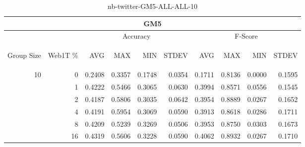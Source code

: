 \begin{center}
\begin{table}[htbp]
\begin{tabular}{ | r | r | r | r | r | r | r | r | r | r |}
\hline
\multicolumn{10}{|c|}{GM5}\\
\hline
 & & \multicolumn{4}{|c|}{Accuracy} & \multicolumn{4}{|c|}{F-Score}\\ \cline{3-10}
\begin{sideways}Group Size\end{sideways} & \begin{sideways}Web1T \%\end{sideways} & \begin{sideways}AVG\end{sideways} & \begin{sideways}MAX\end{sideways} & \begin{sideways}MIN\end{sideways} & \begin{sideways}STDEV\end{sideways} & \begin{sideways}AVG\end{sideways} & \begin{sideways}MAX\end{sideways} & \begin{sideways}MIN\end{sideways} & \begin{sideways}STDEV\end{sideways}\\
\hline
\multirow{5}{*}{10}
 & 0 & 0.2408 & 0.3357 & 0.1748 & 0.0354 & 0.1711 & 0.8136 & 0.0000 & 0.1595\\ \cline{2-10}
 & 1 & 0.4222 & 0.5466 & 0.3065 & 0.0630 & 0.3994 & 0.8571 & 0.0556 & 0.1545\\ \cline{2-10}
 & 2 & 0.4187 & 0.5806 & 0.3035 & 0.0642 & 0.3954 & 0.8889 & 0.0267 & 0.1652\\ \cline{2-10}
 & 4 & 0.4191 & 0.5954 & 0.3069 & 0.0590 & 0.3913 & 0.8618 & 0.0286 & 0.1711\\ \cline{2-10}
 & 8 & 0.4209 & 0.5239 & 0.3269 & 0.0506 & 0.3953 & 0.8750 & 0.0303 & 0.1673\\ \cline{2-10}
 & 16 & 0.4319 & 0.5606 & 0.3228 & 0.0590 & 0.4062 & 0.8932 & 0.0267 & 0.1710\\ \cline{2-10}
\hline
\end{tabular}
\caption{nb-twitter-GM5-ALL-ALL-10}
\label{table:nb-twitter-GM5-ALL-ALL-10}
\end{table}
\end{center}

